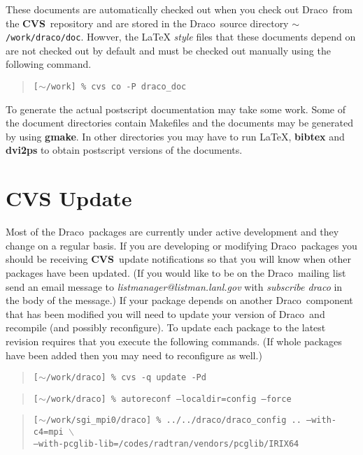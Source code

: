 \documentclass[10pt]{nmemo}
\newcommand{\comp}[1]{\normalfont\normalsize\texttt{#1}}
\newcommand{\draco}{{\normalfont\sffamily Draco}}
\newcommand{\cvs}{{\normalfont\bfseries CVS}}
\begin{document}
These documents are automatically checked out when you check out
\draco\ from the \cvs\ repository and are stored in the \draco\ source
directory \comp{$\sim$/work/draco/doc}.  Howver, the \LaTeX
\emph{style} files that these documents depend on are not checked out
by default and must be checked out manually using the following
command.

\footnotesize
\begin{quote}
\texttt{[$\sim$/work] \% cvs co -P draco\_doc}
\end{quote}
\normalsize

To generate the actual postscript documentation may take some work.
Some of the document directories contain Makefiles and the documents
may be generated by using \textbf{gmake}.  In other directories you
may have to run \LaTeX, \textbf{bibtex} and \textbf{dvi2ps} to obtain
postscript versions of the documents.

\section{CVS Update}

Most of the \draco\ packages are currently under active development
and they change on a regular basis.  If you are developing or
modifying \draco\ packages you should be receiving \cvs\ update
notifications so that you will know when other packages have been
updated.  (If you would like to be on the \draco\ mailing list send an
email message to \emph{listmanager@listman.lanl.gov} with
\emph{subscribe draco} in the body of the message.)  If your package
depends on another \draco\ component that has been modified you will
need to update your version of \draco\ and recompile (and possibly
reconfigure).  To update each package to the latest revision requires
that you execute the following commands.  (If whole packages have been
added then you may need to reconfigure as well.)

\footnotesize
\begin{verse}
\texttt{[$\sim$/work/draco] \% cvs -q update -Pd}
\end{verse}

\begin{verse}
\texttt{[$\sim$/work/draco] \% autoreconf --localdir=config --force}
\end{verse}

\begin{verse}
\texttt{[$\sim$/work/sgi\_mpi0/draco] \% ../../draco/draco\_config
.. --with-c4=mpi $\backslash$ \\
\hspace{0.5in}--with-pcglib-lib=/codes/radtran/vendors/pcglib/IRIX64}
\end{verse}
\end{document}
